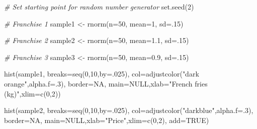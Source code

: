 \documentclass[
]{book}
\newenvironment{Shaded}{\begin{snugshade}}{\end{snugshade}}
\newcommand{\AttributeTok}[1]{\textcolor[rgb]{0.77,0.63,0.00}{#1}}
\newcommand{\CommentTok}[1]{\textcolor[rgb]{0.56,0.35,0.01}{\textit{#1}}}
\newcommand{\ConstantTok}[1]{\textcolor[rgb]{0.00,0.00,0.00}{#1}}
\newcommand{\DecValTok}[1]{\textcolor[rgb]{0.00,0.00,0.81}{#1}}
\newcommand{\FloatTok}[1]{\textcolor[rgb]{0.00,0.00,0.81}{#1}}
\newcommand{\FunctionTok}[1]{\textcolor[rgb]{0.00,0.00,0.00}{#1}}
\newcommand{\NormalTok}[1]{#1}
\newcommand{\OtherTok}[1]{\textcolor[rgb]{0.56,0.35,0.01}{#1}}
\newcommand{\StringTok}[1]{\textcolor[rgb]{0.31,0.60,0.02}{#1}}
\begin{document}
\begin{Shaded}
\begin{Highlighting}[]
\CommentTok{\# Set starting point for random number generator}
\FunctionTok{set.seed}\NormalTok{(}\DecValTok{2}\NormalTok{)}

\CommentTok{\# Franchise 1}
\NormalTok{sample1 }\OtherTok{\textless{}{-}} \FunctionTok{rnorm}\NormalTok{(}\AttributeTok{n=}\DecValTok{50}\NormalTok{, }\AttributeTok{mean=}\DecValTok{1}\NormalTok{, }\AttributeTok{sd=}\NormalTok{.}\DecValTok{15}\NormalTok{)}

\CommentTok{\# Franchise 2}
\NormalTok{sample2 }\OtherTok{\textless{}{-}} \FunctionTok{rnorm}\NormalTok{(}\AttributeTok{n=}\DecValTok{50}\NormalTok{, }\AttributeTok{mean=}\FloatTok{1.1}\NormalTok{, }\AttributeTok{sd=}\NormalTok{.}\DecValTok{15}\NormalTok{)}

\CommentTok{\# Franchise 3}
\NormalTok{sample3 }\OtherTok{\textless{}{-}} \FunctionTok{rnorm}\NormalTok{(}\AttributeTok{n=}\DecValTok{50}\NormalTok{, }\AttributeTok{mean=}\FloatTok{0.9}\NormalTok{, }\AttributeTok{sd=}\NormalTok{.}\DecValTok{15}\NormalTok{)}

\FunctionTok{hist}\NormalTok{(sample1,}
     \AttributeTok{breaks=}\FunctionTok{seq}\NormalTok{(}\DecValTok{0}\NormalTok{,}\DecValTok{10}\NormalTok{,}\AttributeTok{by=}\NormalTok{.}\DecValTok{025}\NormalTok{),}
     \AttributeTok{col=}\FunctionTok{adjustcolor}\NormalTok{(}\StringTok{"dark orange"}\NormalTok{,}\AttributeTok{alpha.f=}\NormalTok{.}\DecValTok{3}\NormalTok{),}
     \AttributeTok{border=}\ConstantTok{NA}\NormalTok{,}
     \AttributeTok{main=}\ConstantTok{NULL}\NormalTok{,}\AttributeTok{xlab=}\StringTok{"French fries (kg)"}\NormalTok{,}\AttributeTok{xlim=}\FunctionTok{c}\NormalTok{(}\DecValTok{0}\NormalTok{,}\DecValTok{2}\NormalTok{))}

\FunctionTok{hist}\NormalTok{(sample2,}
     \AttributeTok{breaks=}\FunctionTok{seq}\NormalTok{(}\DecValTok{0}\NormalTok{,}\DecValTok{10}\NormalTok{,}\AttributeTok{by=}\NormalTok{.}\DecValTok{025}\NormalTok{),}
     \AttributeTok{col=}\FunctionTok{adjustcolor}\NormalTok{(}\StringTok{"darkblue"}\NormalTok{,}\AttributeTok{alpha.f=}\NormalTok{.}\DecValTok{3}\NormalTok{),}
     \AttributeTok{border=}\ConstantTok{NA}\NormalTok{,}
     \AttributeTok{main=}\ConstantTok{NULL}\NormalTok{,}\AttributeTok{xlab=}\StringTok{"Price"}\NormalTok{,}\AttributeTok{xlim=}\FunctionTok{c}\NormalTok{(}\DecValTok{0}\NormalTok{,}\DecValTok{2}\NormalTok{),}
     \AttributeTok{add=}\ConstantTok{TRUE}\NormalTok{)}


\end{Highlighting}
\end{Shaded}
\end{document}

